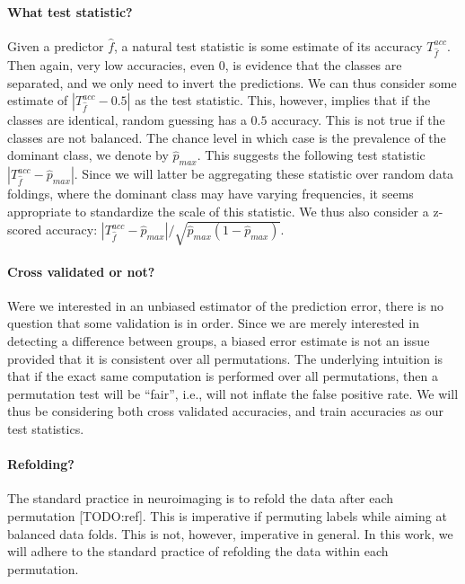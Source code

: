 \documentclass{pnastwo}
\newcommand{\hyp}{f} %
\newcommand{\hypEstim}{\hat{\hyp}} %
\newcommand{\acc}{T^{acc}}
\newcommand{\dominant}{\hat{p}_{max}}
\begin{document}
\begin{article}
\begin{description}
\paragraph{What test statistic?}
Given a predictor $\hypEstim$, a natural test statistic is some estimate of its accuracy $\acc_{\hypEstim}$.
Then again, very low accuracies, even $0$, is evidence that the classes are separated, and we only need to invert the predictions. We can thus consider some estimate of $|\acc_{\hypEstim}-0.5|$ as the test statistic.
This, however, implies that if the classes are identical, random guessing has a $0.5$ accuracy. This is not true if the classes are not balanced. 
The chance level in which case is the prevalence of the dominant class, we denote by $\dominant$.
This suggests the following test statistic $|\acc_{\hypEstim}-\dominant|$.
Since we will latter be aggregating these statistic over random data foldings, where the dominant class may have varying frequencies, it seems appropriate to standardize the scale of this statistic. 
We thus also consider a z-scored accuracy: $|\acc_{\hypEstim}-\dominant|/\sqrt{\dominant(1-\dominant)}$.


\paragraph{Cross validated or not?}
Were we interested in an unbiased estimator of the prediction error, there is no question that some validation is in order. 
Since we are merely interested in detecting a difference between groups, a biased error estimate is not an issue provided that it is consistent over all permutations. 
The underlying intuition is that if the exact same computation is performed over all permutations, then a permutation test will be ``fair'', i.e., will not inflate the false positive rate. 
We will thus be considering both cross validated accuracies, and train accuracies as our test statistics. 


\paragraph{Refolding?}
The standard practice in neuroimaging is to refold the data after each permutation [TODO:ref].
This is imperative if permuting labels while aiming at balanced data folds. 
This is not, however, imperative in general. 
In this work, we will adhere to the standard practice of refolding the data within each permutation.



\end{description}
\end{article}
\end{document}
